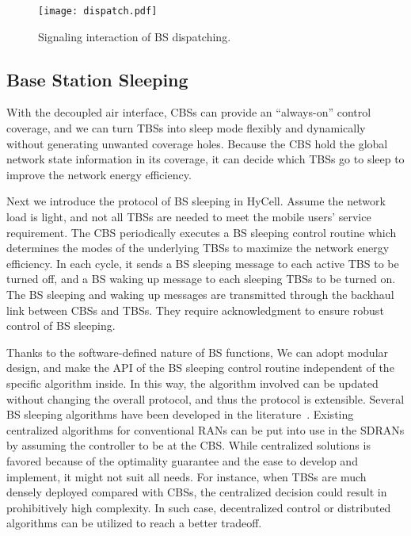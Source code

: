 \documentclass[conference]{IEEEtran}
\begin{document}
\begin{figure}[!t]
  \centering
  \texttt{[image: dispatch.pdf]}
  \caption{Signaling interaction of BS dispatching.}
  \label{fig:disp}
\end{figure}

\subsection{Base Station Sleeping}
\label{sec:sleep}

With the decoupled air interface, CBSs can provide an ``always-on''
control coverage, and we can turn TBSs into sleep mode flexibly and dynamically
without generating unwanted coverage holes. Because the CBS hold the global
network state information in its coverage, it can decide
which TBSs go to sleep to improve the network energy efficiency.

Next we introduce the protocol of BS sleeping in HyCell.
Assume the network load is light, and not
all TBSs are needed to meet the mobile users' service requirement.
The CBS periodically executes a BS sleeping control routine which determines
the modes of the underlying TBSs to maximize the network energy efficiency.
In each cycle,
it sends a BS sleeping message to each active TBS to be turned off,
and a BS waking up message to each sleeping TBSs to be turned on.
The BS sleeping and waking up messages are transmitted through the
backhaul link between CBSs and TBSs. They require acknowledgment to ensure
robust control of BS sleeping.

Thanks to the software-defined nature of BS functions,
We can adopt modular design, and make the API of the BS sleeping control routine
independent of the specific algorithm inside. In this way,
the algorithm involved can be updated without changing the overall protocol,
and thus the protocol is extensible.
Several BS sleeping algorithms have been developed in the
literature~\cite{zhou2009green,guo2013optimal,soh2013energy,zhang2014energy}.
Existing centralized algorithms for conventional RANs
can be put into use in the SDRANs by assuming the controller
to be at the CBS.
While centralized solutions is favored because of the optimality guarantee and
the ease to develop and implement, it might not suit all
needs. For instance, when TBSs are much densely deployed compared with CBSs,
the centralized decision could result in prohibitively high complexity. In such
case, decentralized control or distributed algorithms can be utilized to
reach a better tradeoff.
\end{document}
